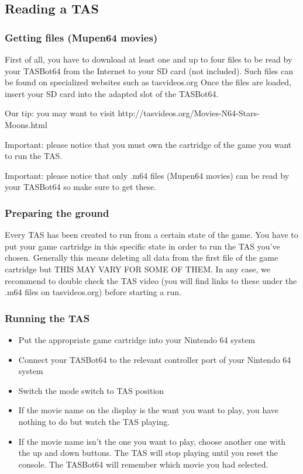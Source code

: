 \documentclass[a4paper,oneside,12pt]{article}
\begin{document}
\subsection{Reading a TAS}
\subsubsection{Getting files (Mupen64 movies)}
First of all, you have to download at least one and up to four files to be read
by your TASBot64 from the Internet to your SD card (not included). Such files
can be found on specialized websites such as tasvideos.org
Once the files are loaded, insert your SD card into the adapted slot of the
TASBot64.

Our tip: you may want to visit http://tasvideos.org/Movies-N64-Stars-Moons.html

Important: please notice that you must own the cartridge of the game you want to
run the TAS.

Important: please notice that only .m64 files (Mupen64 movies) can be read by
your TASBot64 so make sure to get these.

\subsubsection{Preparing the ground}
Every TAS has been created to run from a certain state of the game. You have to
put your game cartridge in this specific state in order to run the TAS you've
chosen. Generally this means deleting all data from the first file of the game
cartridge but THIS MAY VARY FOR SOME OF THEM. In any case, we recommend to
double check the TAS video (you will find links to these under the .m64 files on
tasvideos.org) before starting a run.

\subsubsection{Running the TAS}
\begin{itemize}
\item Put the appropriate game cartridge into your Nintendo 64 system
\item Connect your TASBot64 to the relevant controller port of your Nintendo 64
system
\item Switch the mode switch to TAS position
\item If the movie name on the display is the want you want to play, you have
  nothing to do but watch the TAS playing.
\item If the movie name isn't the one you want to play, choose another one with
  the up and down buttons. The TAS will stop playing until you reset the
  console. The TASBot64 will remember which movie you had selected.
\end{itemize}
\end{document}
